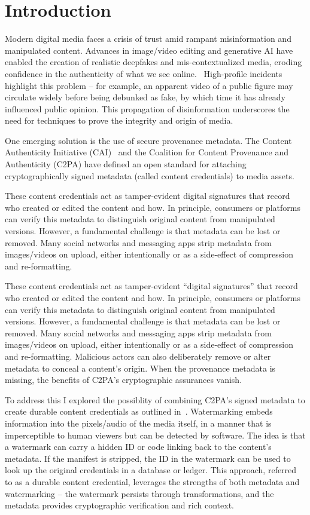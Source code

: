 \documentclass[12pt, technote]{IEEEtran}
\begin{document}
\section{Introduction}

Modern digital media faces a crisis of trust amid rampant misinformation and manipulated content. Advances in image/video editing and generative AI have enabled the creation of realistic deepfakes and mis-contextualized media, eroding confidence in the authenticity of what we see online.~\cite{Parsons_2024}
High-profile incidents highlight this problem – for example, an apparent video of a public figure may circulate widely before being debunked as fake, by which time it has already influenced public opinion. This propagation of disinformation underscores the need for techniques to prove the integrity and origin of media.

One emerging solution is the use of secure provenance metadata. The Content Authenticity Initiative (CAI)~\cite{Parsons_2024} and the Coalition for Content Provenance and Authenticity (C2PA) have defined an open standard for attaching cryptographically signed metadata (called content credentials) to media assets.~\cite{C2PA}

These content credentials act as tamper-evident digital signatures that record who created or edited the content and how. In principle, consumers or platforms can verify this metadata to distinguish original content from manipulated versions. However, a fundamental challenge is that metadata can be lost or removed. Many social networks and messaging apps strip metadata from images/videos on upload, either intentionally or as a side-effect of compression and re-formatting.~\cite{durablecontent}

These content credentials act as tamper-evident “digital signatures” that record who created or edited the content and how. In principle, consumers or platforms can verify this metadata to distinguish original content from manipulated versions. However, a fundamental challenge is that metadata can be lost or removed. Many social networks and messaging apps strip metadata from images/videos on upload, either intentionally or as a side-effect of compression and re-formatting. Malicious actors can also deliberately remove or alter metadata to conceal a content’s origin. When the provenance metadata is missing, the benefits of C2PA’s cryptographic assurances vanish.\cite{trustmark}

To address this I explored the possiblity of combining C2PA's signed metadata to create durable content credentials as outlined in~\cite{durablecontent}. Watermarking embeds information into the pixels/audio of the media itself, in a manner that is imperceptible to human viewers but can be detected by software. The idea is that a watermark can carry a hidden ID or code linking back to the content’s metadata. If the manifest is stripped, the ID in the watermark can be used to look up the original credentials in a database or ledger. This approach, referred to as a durable content credential, leverages the strengths of both metadata and watermarking – the watermark persists through transformations, and the metadata provides cryptographic verification and rich context.\cite{durablecontent}
\end{document}
